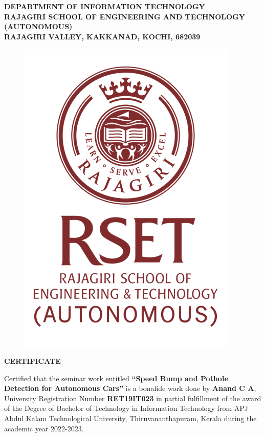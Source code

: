 \thispagestyle{empty}

\graphicspath{{Figures/}}
\begin{center}
\textbf{
DEPARTMENT OF INFORMATION TECHNOLOGY \\
RAJAGIRI SCHOOL OF ENGINEERING AND TECHNOLOGY (AUTONOMOUS) \\
RAJAGIRI VALLEY, KAKKANAD, KOCHI, 682039 \\
}
    \begin{figure}[h]
        \centering
        \includegraphics[scale=0.5]{rset_logo_certificate.png}
    \end{figure}

 
\LARGE \textbf{CERTIFICATE} \\
			
								
\end{center}
\noindent
Certified that the seminar work entitled \textbf{“Speed Bump and Pothole Detection for Autonomous Cars”} is a bonafide work done by \textbf{Anand C A}, University Registration Number \textbf{RET19IT023} in partial fulfillment of the award of the Degree of Bachelor of Technology in Information Technology from APJ Abdul Kalam Technological University, Thiruvananthapuram, Kerala during the academic year 2022-2023.

